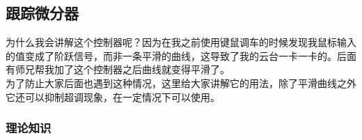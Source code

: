 \documentclass[UTF8,a4paper,12pt]{ctexart}
\begin{document}
        
        \subsection{跟踪微分器}
        \begin{flushleft}
          为什么我会讲解这个控制器呢？因为在我之前使用键鼠调车的时候发现我鼠标输入的值变成了阶跃信号，而非一条平滑的曲线，这导致了我的云台一卡一卡的。后面有师兄帮我加了这个控制器之后曲线就变得平滑了。
          \\为了防止大家后面也遇到这种情况，这里给大家讲解它的用法，除了平滑曲线之外它还可以抑制超调现象，在一定情况下可以使用。
        \end{flushleft}
          \subsubsection{理论知识}
          
\end{document}
